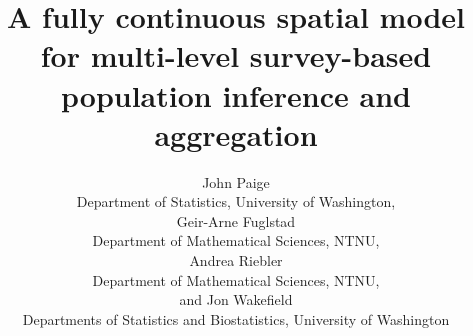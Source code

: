 \documentclass[12pt]{article}
\begin{document}
%

\def\spacingset#1{\renewcommand{\baselinestretch}%
{#1}\small\normalsize} \spacingset{1}




  \title{A fully continuous spatial model for multi-level survey-based population inference and aggregation}
  \author{John Paige\\
    Department of Statistics, University of Washington,\\
    Geir-Arne Fuglstad \\
    Department of Mathematical Sciences, NTNU, \\
    Andrea Riebler \\
    Department of Mathematical Sciences, NTNU, \\
    and Jon Wakefield \\
    Departments of Statistics and Biostatistics, University of Washington}
  \maketitle
\end{document}
